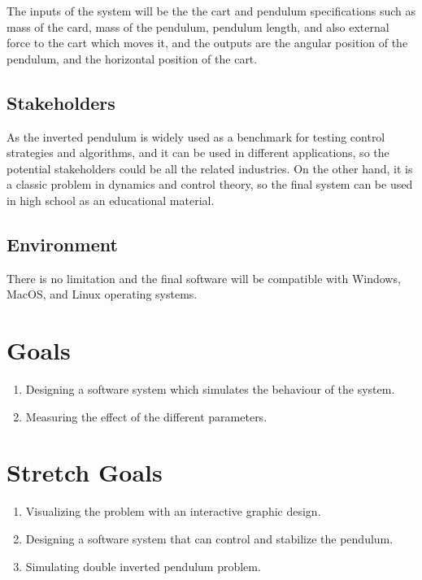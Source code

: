 \documentclass{article}
\begin{document}
The inputs of the system will be the the cart and pendulum specifications such as mass of the card, mass of the pendulum, pendulum length, and also external force to the cart which moves it, and the outputs are the angular position of the pendulum, and the horizontal position of the cart.

\subsection{Stakeholders}

As the inverted pendulum is widely used as a benchmark for testing control strategies and algorithms, and it can be used in different applications, so the potential stakeholders could be all the related industries. On the other hand, it is a classic problem in dynamics and control theory, so the final system can be used in high school as an educational material.

\subsection{Environment}

There is no limitation and the final software will be compatible with Windows, MacOS, and Linux operating systems.

\section{Goals}

\begin{enumerate}
  \item Designing a software system which simulates the behaviour of the system.
  \item	Measuring the effect of the different parameters.
\end{enumerate}
\section{Stretch Goals}
\begin{enumerate}
  \item Visualizing the problem with an interactive graphic design.
  \item Designing a software system that can control and stabilize the pendulum.
  \item Simulating double inverted pendulum problem.
\end{enumerate}
\end{document}
